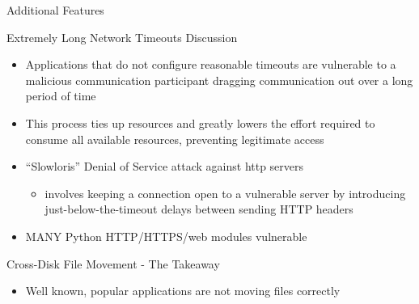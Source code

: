 \documentclass[pdf]{beamer}
\begin{document}
\begin{frame}{Additional Features}
\begin{itemize}
\begin{frame}{Extremely Long Network Timeouts Discussion}
  \begin{itemize}
  \item{Applications that do not configure reasonable timeouts are vulnerable
      to a malicious communication participant dragging communication out over a
      long period of time}
  \item{This process ties up resources and greatly lowers the effort required to
      consume all available resources, preventing legitimate access}
  \item{``Slowloris'' Denial of Service attack against http servers}
    \begin{itemize}
    \item{involves keeping a connection open to a vulnerable server by
        introducing just-below-the-timeout delays between sending HTTP headers}
        \end{itemize}
  \item{MANY Python HTTP/HTTPS/web modules vulnerable}
  \end{itemize}
\end{frame}


\begin{frame}{Cross-Disk File Movement - The Takeaway}
  \begin{itemize}
    \item{Well known, popular applications are not moving files correctly}
  \end{itemize}
\end{frame}



\end{itemize}
\end{frame}
\end{document}
